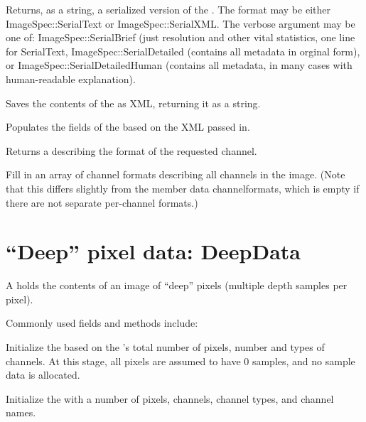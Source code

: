 Returns, as a string, a serialized version of the \ImageSpec.
The {\cf format} may be either {\cf ImageSpec::SerialText} or
{\cf ImageSpec::SerialXML}.
The {\cf verbose} argument may be one of: {\cf ImageSpec::SerialBrief} (just
resolution and other vital statistics, one line for {\cf SerialText},
{\cf ImageSpec::SerialDetailed} (contains all metadata in orginal form), or
{\cf ImageSpec::SerialDetailedHuman} (contains all metadata, in many cases
with human-readable explanation).

\apiend

Saves the contents of the \ImageSpec as XML, returning it as a string.
\apiend

Populates the fields of the \ImageSpec based on the XML passed in.
\apiend

Returns a \TypeDesc describing the format of the requested channel.
\apiend

Fill in an array of channel formats describing all channels in the
image.  (Note that this differs slightly from the member data 
{\cf channelformats}, which is empty if there are not separate per-channel
formats.)
\apiend



\section{``Deep'' pixel data: {\cf DeepData}}
\label{sec:deepdata}

A \DeepData holds the contents of an image of ``deep'' pixels (multiple
depth samples per pixel).

\noindent Commonly used \DeepData fields and methods include:

Initialize the \DeepData based on the \ImageSpec's total number of pixels,
number and types of channels. At this stage, all pixels are assumed to
have 0 samples, and no sample data is allocated.
\apiend

Initialize the \DeepData with a number of pixels, channels, channel
types, and channel names.
\apiend

